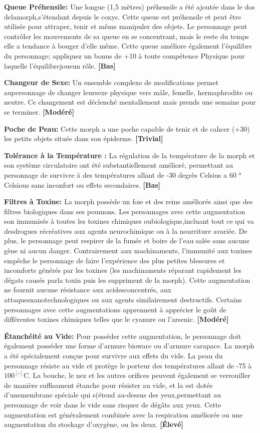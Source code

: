 \textbf{Queue Préhensile:} Une longue (1,5 mètres) préhensile a été ajoutée dans le dos delamorph,s'étendant depuis le coxys. Cette queue est préhensile et peut être utilisée pour attraper, tenir et même manipuler des objets. Le personnage peut contrôler les mouvements de sa queue en se concentrant, mais le reste du temps elle a tendance à bouger d'elle même. Cette queue améliore également l'équilibre du personnage; appliquez un bonus de +10 à toute compétence Physique pour laquelle l'équilibrejoueun rôle. \textbf{[Bas]} 

\textbf{Changeur de Sexe:} Un ensemble complexe de modifications permet aupersonnage de changer leursexe physique vers mâle, femelle, hermaphrodite ou neutre. Ce changement est déclenché mentallement mais prends une semaine pour se terminer. \textbf{[Modéré]} 

\textbf{Poche de Peau:} Cette morph a une poche capable de tenir et de cahcer (+30) les petits objets située dans son épiderme. \textbf{[Trivial]} 

\textbf{Tolérance à la Température :} La régulation de la température de la morph et son système circulatoire ont été substantiellement amélioré, permettant au personnage de survivre à des températures allant de -30 degrès Celsius a 60 ° Celsious sans inconfort ou effets secondaires. \textbf{[Bas]} 

\textbf{Filtres à Toxine:} La morph possède un foie et des reins améliorés ainsi que des filtres biologiques dans ses poumons. Les personnages avec cette augmentation son immunisés à toutes les toxines chimiques oubiologique,incluant tout ce qui va desdrogues récréatives aux agents neurochimique ou à la nourriture avariée. De plus, le personnage peut respirer de la fumée et boire de l'eau salée sans aucune gène ni aucun danger. Contrairement aux machinaments, l'immunité aux toxines empêche le personnage de faire l'expérience des plus petites blessures et incomforts générés par les toxines (les machinaments réparant rapidement les dégats causés parla toxin puis les suppriment de la morph). Cette augmentation ne fournit aucune résistance aux acidesconcentrés, aux attaquesnanotechnologiques ou aux agents similairement destructifs. Certains personnages avec cette augmentations apprennent à apprécier le goût de différentes toxines chimiques telles que le cyanure ou l'arsenic. \textbf{[Modéré]} 

\textbf{Étanchéité au Vide:} Pour posséder cette augmentation, le personnage doit également posséder une forme d'armure bioware ou d'armure carapace. La morph a été spécialement conçue pour survivre aux effets du vide. La peau du personnage résiste au vide et protège le porteur des températures allant de -75 à $100^[\circ]$C. La bouche, le nez et les autres orifices peuvent également se verrouiller de manière suffisament étanche pour résister au vide, et la est dotée d'unemembrane spéciale qui s(étend au-dessus des yeux,permettant au personnage de voir dans le vide sans risquer de dégâts aux yeux. Cette augmentation est généralement combinée avec la respiration améliorée ou une augmentation du stockage d'oxygène, ou les deux. \textbf{[Élevé]} 

